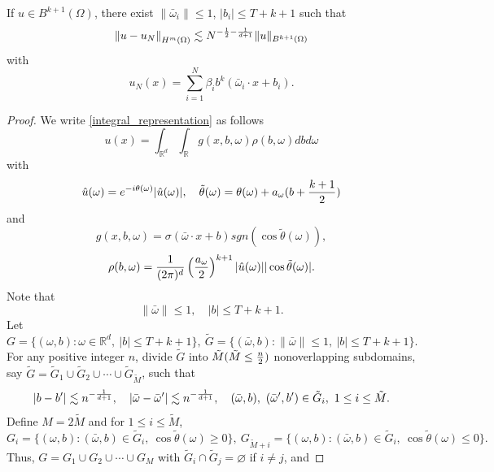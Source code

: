 \begin{theorem}
If $u\in {B}^{k+1}(\Omega)$, there exist $\|\bar \omega_i\|\le 1$, $|b_i|\le T + k+1$ such that
\begin{equation}\label{d+1}
\left\|u - u_{N}\right\|_{H^{m}(\Omega)}\lesssim  N^{-{1\over 2}-{1\over d+1}} \|u\|_{{B}^{k+1}(\Omega)}
\end{equation}
with
\begin{equation}
u_{N}(x)=\sum_{i=1}^{N} \beta_i b^k\left(\bar \omega_i\cdot x+b_i\right) .
\end{equation} 
\end{theorem}
\begin{proof}
We write \eqref{integral_representation} as follows
$$
\displaystyle u(x)= \int_{\mathbb{R}^d}\int_\mathbb{R}
g(x, b, \omega)\rho(b,\omega) dbd\omega
$$
with 
$$ 
\hat{u}(\omega) = e^{-i\theta(\omega)} | \hat{u}(\omega)|,\quad \tilde \theta(\omega)=\theta(\omega) + a_\omega(b+{k+1\over 2})
$$ and 
\begin{equation}\label{eq:g}
g(x, b, \omega) = \sigma\left({\bar \omega}\cdot x+b\right)sgn(\cos \tilde\theta(\omega)),
\end{equation}
\begin{equation}\label{eq:rho}
\rho(b,\omega) = \frac{1}{(2\pi)^d}\left({a_\omega\over 2}\right)^{k+1}| \hat{u}(\omega)||\cos \tilde\theta(\omega)|.
\end{equation} 
Note that
\begin{equation}
\|\bar\omega\|\le 1, \quad |b|\le T+k+1.
\end{equation} 
Let 
$$
G=\{(\omega, b): \omega\in \mathbb{R}^d,\ |b|\le T+k+1\}, \ \tilde G=\{(\bar \omega, b): \|\bar \omega\| \le 1,\ |b|\le T+k+1\}.
$$
For any positive integer $n$, divide $\tilde  G$ into $\tilde  M(\tilde  M\le {n\over 2})$   nonoverlapping subdomains, say 
$\tilde  G=\tilde  G_1\cup \tilde  G_2\cup \cdots \cup\tilde  G_{\tilde M}$, such that
\begin{equation}
|b-b'|\lesssim n^{-{1\over d+1}},\quad |\bar\omega - \bar\omega'|\lesssim  n^{-{1\over d+1}}, \quad (\bar\omega, b),\ (\bar\omega', b')\in \tilde G_i,\ 1\le i\le \tilde M.
\end{equation} 
Define $M=2\tilde  M$ and for $1\le i\le \tilde M$,
$$
G_i = \{(\omega, b): (\bar \omega, b)\in \tilde  G_i, \ \cos \tilde\theta(\omega)\ge 0\},\ 
G_{\tilde  M+i} = \{(\omega, b): (\bar \omega, b)\in \tilde  G_i, \ \cos \tilde\theta(\omega)\le 0\}.
$$
Thus, $G=G_1\cup G_2\cup \cdots \cup G_M$ with $\tilde  G_i\cap \tilde G_j=\varnothing$ if $i\neq j$, and 

\end{proof}
